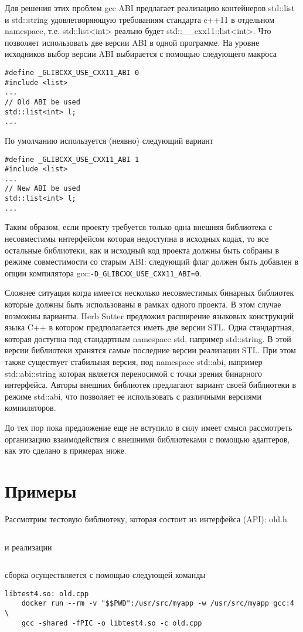 \documentclass[14pt,a4paper]{article}
\begin{document}
Для решения этих проблем gcc ABI предлагает реализацию контейнеров
std::list и std::string
удовлетворяющую требованиям стандарта c++11 
 в отдельном namespace, т.е. std::list<int> реально будет 
std::\_\_cxx11::list<int>. Что позволяет использовать две версии ABI в
одной программе. На уровне исходников выбор версии ABI выбирается с помощью
следующего макроса
\begin{verbatim}
#define _GLIBCXX_USE_CXX11_ABI 0
#include <list>
...
// Old ABI be used
std::list<int> l;
...
\end{verbatim} 

По умолчанию используется (неявно) следующий вариант
\begin{verbatim}
#define _GLIBCXX_USE_CXX11_ABI 1
#include <list>
...
// New ABI be used
std::list<int> l;
...
\end{verbatim} 

Таким образом, если проекту требуется только одна внешняя библиотека с
несовместимы интерфейсом которая недоступна в исходных кодах, то все
остальные библиотеки, как и исходный код проекта должны быть собраны в
режиме совместимости со старым ABI: следующий флаг должен быть
добавлен в опции компилятора gcc:\texttt{-D\_GLIBCXX\_USE\_CXX11\_ABI=0}. 

Сложнее ситуация когда имеется несколько несовместимых бинарных
библиотек которые должны быть использованы в рамках одного проекта.
В этом случае возможны варианты. Herb Sutter предложил \cite{sutter}
расширение языковых конструкций языка C++ в котором предполагается
иметь две версии STL. Одна стандартная, которая доступна под
стандартным namespace std, например std::string. В этой версии
библиотеки хранятся самые последние версии реализации STL. При этом
также существует стабильная версия, под namespace std::abi, например
std::abi::string которая является переносимой с точки зрения бинарного
интерфейса. Авторы внешних библиотек предлагают вариант своей
библиотеки в режиме std::abi, что позволяет ее использовать с
различными версиями компиляторов.

До тех пор пока предложение \cite{sutter} еще не вступило в силу имеет
смысл рассмотреть организацию взаимодействия с внешними библиотеками с
помощью адаптеров, как это сделано в примерах ниже.

\section{Примеры}

Рассмотрим тестовую библиотеку, которая состоит из интерфейса (API):
old.h
\inputminted{c++}{./src/old.h}
и реализации 
\inputminted{c++}{./src/old.cpp}
сборка осуществляется с помощью следующей команды
\begin{verbatim}
libtest4.so: old.cpp
	docker run --rm -v "$$PWD":/usr/src/myapp -w /usr/src/myapp gcc:4 \
	gcc -shared -fPIC -o libtest4.so -c old.cpp
\end{verbatim}
\end{document}
